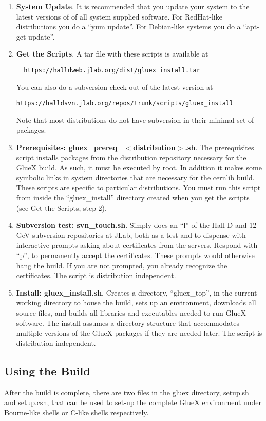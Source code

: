 \documentclass[12pt]{article}
\begin{document}
\begin{enumerate}

\item {\bf System Update}. It is recommended that you update your
  system to the latest versions of of all system supplied
  software. For RedHat-like distributions you do a ``yum update''. For
  Debian-like systems you do a ``apt-get update''.

\item {\bf Get the Scripts}. A tar file with these scripts is
  available at
\begin{verbatim}
  https://halldweb.jlab.org/dist/gluex_install.tar
\end{verbatim}
  You can also do a subversion check out of the latest version at
\begin{verbatim}
https://halldsvn.jlab.org/repos/trunk/scripts/gluex_install
\end{verbatim}
Note that most distributions do not have subversion in their minimal
set of packages.

\item {\bf Prerequisites: gluex\_prereq\_$<$distribution$>$.sh}. The
  prerequisites script installs packages from the distribution
  repository necessary for the GlueX build. As such, it must be
  executed by root. In addition it makes some symbolic links in system
  directories that are necessary for the cernlib build. These scripts
  are specific to particular distributions. You must run this
  script from inside the ``gluex\_install'' directory created when you
  get the scripts (see Get the Scripts, step 2).

\item {\bf Subversion test: svn\_touch.sh}. Simply does an ``l'' of the
  Hall D and 12 GeV subversion repositories at JLab, both as a test
  and to dispense with interactive prompts asking about certificates
  from the servers. Respond with ``p'', to permanently accept the
  certificates. These prompts would otherwise hang the build. If you
  are not prompted, you already recognize the certificates. The script
  is distribution independent.

\item {\bf Install: gluex\_install.sh}. Creates a directory,
  ``gluex\_top'', in the current working directory to house the build,
  sets up an environment, downloads all source files, and builds all
  libraries and executables needed to run GlueX software. The install
  assumes a directory structure that accommodates multiple versions of
  the GlueX packages if they are needed later. The script is
  distribution independent.

\end{enumerate}

\subsection{Using the Build}

After the build is complete, there are two files in the gluex
directory, setup.sh and setup.csh, that can be used to set-up the
complete GlueX environment under Bourne-like shells or C-like shells
respectively.
\end{document}
